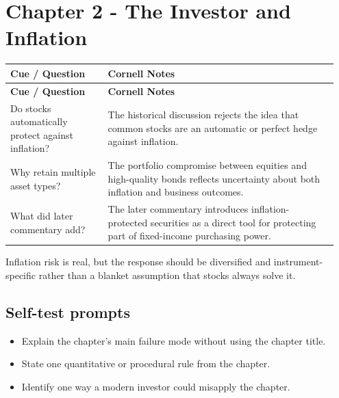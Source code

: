 \documentclass[11pt]{article}
\begin{document}
\section{Chapter 2 - The Investor and Inflation}
\begin{longtable}{@{}>{\raggedright\arraybackslash}p{0.29\linewidth}>{\raggedright\arraybackslash}p{0.66\linewidth}@{}}\toprule\textbf{Cue / Question} & \textbf{Cornell Notes}\\\midrule\endfirsthead\toprule\textbf{Cue / Question} & \textbf{Cornell Notes}\\\midrule\endhead
Do stocks automatically protect against inflation? & The historical discussion rejects the idea that common stocks are an automatic or perfect hedge against inflation. \\
Why retain multiple asset types? & The portfolio compromise between equities and high-quality bonds reflects uncertainty about both inflation and business outcomes. \\
What did later commentary add? & The later commentary introduces inflation-protected securities as a direct tool for protecting part of fixed-income purchasing power. \\
\bottomrule\end{longtable}
\begin{principlebox}Inflation risk is real, but the response should be diversified and instrument-specific rather than a blanket assumption that stocks always solve it.\end{principlebox}
\subsection*{Self-test prompts}\begin{itemize}\item Explain the chapter's main failure mode without using the chapter title.\item State one quantitative or procedural rule from the chapter.\item Identify one way a modern investor could misapply the chapter.\end{itemize}
\end{document}
